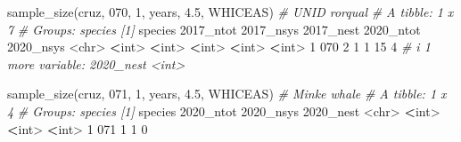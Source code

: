 \documentclass[
]{book}
\newenvironment{Shaded}{\begin{snugshade}}{\end{snugshade}}
\newcommand{\AttributeTok}[1]{\textcolor[rgb]{0.77,0.63,0.00}{#1}}
\newcommand{\CommentTok}[1]{\textcolor[rgb]{0.56,0.35,0.01}{\textit{#1}}}
\newcommand{\DecValTok}[1]{\textcolor[rgb]{0.00,0.00,0.81}{#1}}
\newcommand{\ErrorTok}[1]{\textcolor[rgb]{0.64,0.00,0.00}{\textbf{#1}}}
\newcommand{\FloatTok}[1]{\textcolor[rgb]{0.00,0.00,0.81}{#1}}
\newcommand{\FunctionTok}[1]{\textcolor[rgb]{0.00,0.00,0.00}{#1}}
\newcommand{\NormalTok}[1]{#1}
\newcommand{\SpecialCharTok}[1]{\textcolor[rgb]{0.00,0.00,0.00}{#1}}
\newcommand{\StringTok}[1]{\textcolor[rgb]{0.31,0.60,0.02}{#1}}
\begin{document}
\begin{Shaded}
\begin{Highlighting}[]
\FunctionTok{sample\_size}\NormalTok{(cruz, }\StringTok{\textquotesingle{}070\textquotesingle{}}\NormalTok{, }\DecValTok{1}\NormalTok{, years, }\FloatTok{4.5}\NormalTok{, }\StringTok{\textquotesingle{}WHICEAS\textquotesingle{}}\NormalTok{) }\CommentTok{\# UNID rorqual}
\CommentTok{\# A tibble: 1 x 7}
\CommentTok{\# Groups:   species [1]}
\NormalTok{  species }\StringTok{\textasciigrave{}}\AttributeTok{2017\_ntot}\StringTok{\textasciigrave{}} \StringTok{\textasciigrave{}}\AttributeTok{2017\_nsys}\StringTok{\textasciigrave{}} \StringTok{\textasciigrave{}}\AttributeTok{2017\_nest}\StringTok{\textasciigrave{}} \StringTok{\textasciigrave{}}\AttributeTok{2020\_ntot}\StringTok{\textasciigrave{}} \StringTok{\textasciigrave{}}\AttributeTok{2020\_nsys}\StringTok{\textasciigrave{}}
  \SpecialCharTok{\textless{}}\NormalTok{chr}\SpecialCharTok{\textgreater{}}         \ErrorTok{\textless{}}\NormalTok{int}\SpecialCharTok{\textgreater{}}       \ErrorTok{\textless{}}\NormalTok{int}\SpecialCharTok{\textgreater{}}       \ErrorTok{\textless{}}\NormalTok{int}\SpecialCharTok{\textgreater{}}       \ErrorTok{\textless{}}\NormalTok{int}\SpecialCharTok{\textgreater{}}       \ErrorTok{\textless{}}\NormalTok{int}\SpecialCharTok{\textgreater{}}
\DecValTok{1} \DecValTok{070}               \DecValTok{2}           \DecValTok{1}           \DecValTok{1}          \DecValTok{15}           \DecValTok{4}
\CommentTok{\# i 1 more variable: \textasciigrave{}2020\_nest\textasciigrave{} \textless{}int\textgreater{}}

\FunctionTok{sample\_size}\NormalTok{(cruz, }\StringTok{\textquotesingle{}071\textquotesingle{}}\NormalTok{, }\DecValTok{1}\NormalTok{, years, }\FloatTok{4.5}\NormalTok{, }\StringTok{\textquotesingle{}WHICEAS\textquotesingle{}}\NormalTok{) }\CommentTok{\# Minke whale}
\CommentTok{\# A tibble: 1 x 4}
\CommentTok{\# Groups:   species [1]}
\NormalTok{  species }\StringTok{\textasciigrave{}}\AttributeTok{2020\_ntot}\StringTok{\textasciigrave{}} \StringTok{\textasciigrave{}}\AttributeTok{2020\_nsys}\StringTok{\textasciigrave{}} \StringTok{\textasciigrave{}}\AttributeTok{2020\_nest}\StringTok{\textasciigrave{}}
  \SpecialCharTok{\textless{}}\NormalTok{chr}\SpecialCharTok{\textgreater{}}         \ErrorTok{\textless{}}\NormalTok{int}\SpecialCharTok{\textgreater{}}       \ErrorTok{\textless{}}\NormalTok{int}\SpecialCharTok{\textgreater{}}       \ErrorTok{\textless{}}\NormalTok{int}\SpecialCharTok{\textgreater{}}
\DecValTok{1} \DecValTok{071}               \DecValTok{1}           \DecValTok{1}           \DecValTok{0}


\end{Highlighting}
\end{Shaded}
\end{document}
